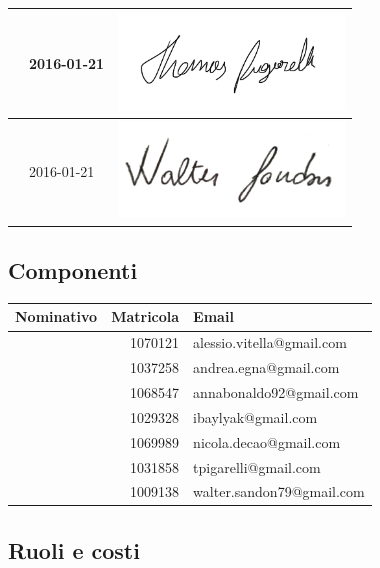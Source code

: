 \documentclass[12pt,a4paper]{article}
\begin{document}
\begin{table}[H]
\begin{center}
\begin{tabular}{l l l}
			\TP{} & 2016-01-21 & \includegraphics[width=6cm]{../img/firmaPigarelli.png} \\ \midrule
			\WS{} & 2016-01-21 & \includegraphics[width=6cm]{../img/firmaSandon.png} \\
			\bottomrule
		\end{tabular}
	\end{center}
\end{table}

\subsection{Componenti}

\begin{table}[H]
	\begin{center}
		\begin{tabular}{l r l}
			\toprule
            \textbf{Nominativo}	& \textbf{Matricola} & \textbf{Email} \\ \midrule
			\midrule
			\AVI{} & 1070121 & alessio.vitella@gmail.com \\ \midrule
			\AVE{} & 1037258 & andrea.egna@gmail.com \\ \midrule
			\AB{} & 1068547 & annabonaldo92@gmail.com \\ \midrule
			\IB{} & 1029328 & ibaylyak@gmail.com \\ \midrule
			\NDC{} & 1069989 & nicola.decao@gmail.com \\ \midrule
			\TP{}  & 1031858 & tpigarelli@gmail.com \\ \midrule
			\WS{} & 1009138 & walter.sandon79@gmail.com \\
			\bottomrule
		\end{tabular}
	\end{center}
\end{table}

\subsection{Ruoli e costi}\label{ruoli e costi}
\end{document}
